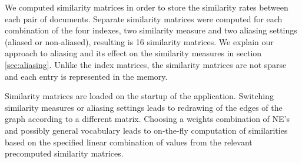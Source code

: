 We computed similarity matrices in order to store the similarity rates between each pair of documents. Separate similarity matrices were computed for each combination of the four indexes, two similarity measure and two aliasing settings (aliased or non-aliased), resulting is 16 similarity matrices. We explain our approach to aliasing and its effect on the similarity measures in section \ref{sec:aliasing}. Unlike the index matrices, the similarity matrices are not sparse and each entry is represented in the memory.

Similarity matrices are loaded on the startup of the application. Switching similarity measures or aliasing settings leads to redrawing of the edges of the graph according to a different matrix. Choosing a weights combination of NE's and possibly general vocabulary leads to on-the-fly computation of similarities based on the specified linear combination of values from the relevant precomputed similarity matrices.



